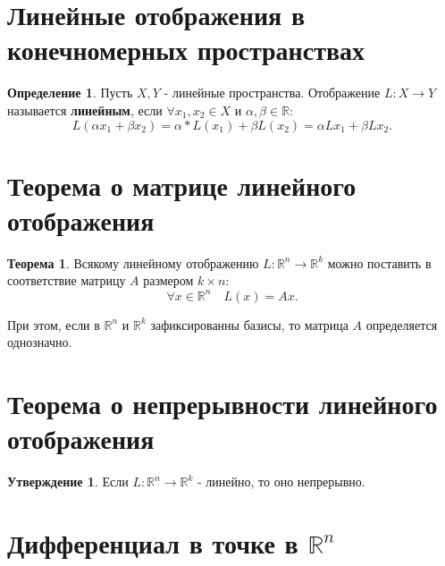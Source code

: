 \documentclass{report}
\theoremstyle{definition}
\newtheorem*{definition}{Определение}
\newtheorem*{statement}{Утверждение}
\newtheorem*{theorem}{Теорема}
\begin{document}
\section{Линейные отображения в конечномерных пространствах}

\begin{definition}
    Пусть $X,Y$ - линейные пространства. Отображение $L: X \rightarrow Y$ называется \textbf{линейным}, если
    $\forall x_1,x_2 \in X$ и $\alpha,\beta \in \mathbb{R}$:
    \begin{equation*}
        L(\alpha x_1 + \beta x_2) = \alpha * L(x_1) + \beta L(x_2) = \alpha L x_1 + \beta L x_2.
    \end{equation*}
\end{definition}

\section{Теорема о матрице линейного отображения}

\begin{theorem}
    Всякому линейному отображению $L:\mathbb{R}^n \rightarrow \mathbb{R}^k$ можно поставить в соответствие
    матрицу $A$ размером $k \times n$:
    \begin{equation*}
        \forall x \in \mathbb{R}^n \quad L(x) = Ax.
    \end{equation*}

    При этом, если в $\mathbb{R}^n$ и $\mathbb{R}^k$ зафиксированны базисы, то матрица $A$ определяется однозначно.
\end{theorem}

\section{Теорема о непрерывности линейного отображения}

\begin{statement}
    Если $L:\mathbb{R}^n \rightarrow \mathbb{R}^k$ - линейно, то оно непрерывно.
\end{statement}

\section{Дифференциал в точке в $\mathbb{R}^n$}
\end{document}
